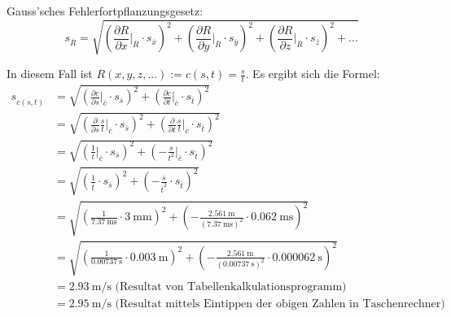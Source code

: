 Gauss'sches Fehlerfortpflanzungsgesetz:
\begin{equation*}
    s_{\overline{R}} = \sqrt{ \left( \frac{\partial R}{\partial x} \biggr\rvert_{\overline{R}} \cdot s_{\overline{x}}\right)^2
                            + \left( \frac{\partial R}{\partial y} \biggr\rvert_{\overline{R}} \cdot s_{\overline{y}}\right)^2
                            + \left( \frac{\partial R}{\partial z} \biggr\rvert_{\overline{R}} \cdot s_{\overline{z}}\right)^2
                            + ... }
\end{equation*}

In diesem Fall ist $R(x,y,z,...) := c(s,t) = \frac{s}{t}$. Es ergibt sich die Formel:
\begin{align*}
    s_{\overline{c(s,t)}} & = \sqrt{ \left( \frac{\partial c}{\partial s} \biggr\rvert_{\overline{c}} \cdot s_{\overline{s}}\right)^2
                            + \left( \frac{\partial c}{\partial t} \biggr\rvert_{\overline{c}} \cdot s_{\overline{t}}\right)^2 } \\
                          & = \sqrt{ \left( \frac{\partial}{\partial s}\frac{s}{t} \biggr\rvert_{\overline{c}} \cdot s_{\overline{s}}\right)^2
                            + \left( \frac{\partial}{\partial t}\frac{s}{t} \biggr\rvert_{\overline{c}} \cdot s_{\overline{t}}\right)^2 } \\
                          & = \sqrt{ \left( \frac{1}{t} \biggr\rvert_{\overline{c}} \cdot s_{\overline{s}}\right)^2
                            + \left( - \frac{s}{t^2} \biggr\rvert_{\overline{c}} \cdot s_{\overline{t}}\right)^2 } \\
                          & = \sqrt{ \left( \frac{1}{\overline{t}} \cdot s_{\overline{s}}\right)^2
                            + \left( - \frac{\overline{s}}{\overline{t}^2} \cdot s_{\overline{t}}\right)^2 } \\
                          & = \sqrt{ \left( \frac{1}{\SI{7.37}{\milli\second}} \cdot \SI{3}{\milli\meter} \right)^2
                            + \left( - \frac{\SI{2.561}{\meter}}{(\SI{7.37}{\milli\second})^2} \cdot \SI{0.062}{\milli\second}\right)^2 } \\
                          & = \sqrt{ \left( \frac{1}{\SI{0.00737}{\second}} \cdot \SI{0.003}{\meter} \right)^2
                            + \left( - \frac{\SI{2.561}{\meter}}{(\SI{0.00737}{\second})^2} \cdot \SI{0.000062}{\second}\right)^2 } \\
                          & = \SI{2.93}{\meter\per\second} \text{ (Resultat von Tabellenkalkulationsprogramm)} \\
                          & = \SI{2.95}{\meter\per\second} \text{ (Resultat mittels Eintippen der obigen Zahlen in Taschenrechner)} \\
\end{align*}

